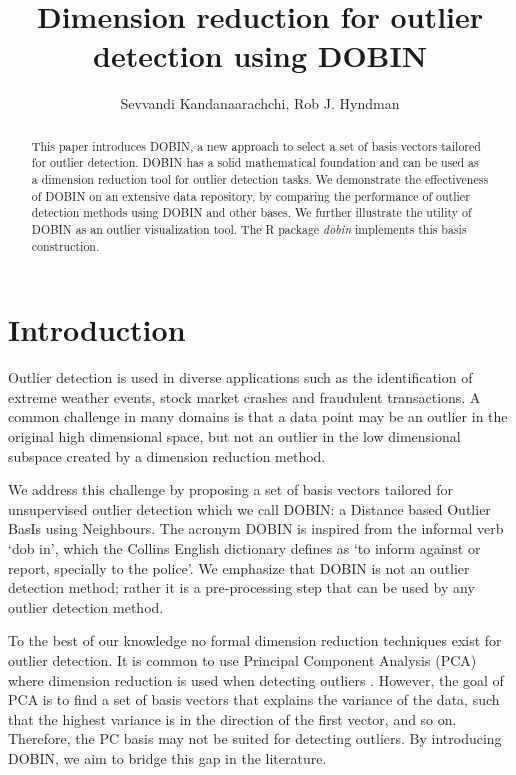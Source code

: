 \documentclass[a4paper,11pt]{article}
\begin{document}

\title{Dimension reduction for outlier detection using DOBIN}
\author{Sevvandi Kandanaarachchi, Rob J. Hyndman}
\maketitle

\begin{abstract}
	This paper introduces DOBIN, a new approach to select a set of basis vectors tailored for outlier detection. DOBIN has a solid mathematical foundation and can be used as a dimension reduction tool for outlier detection tasks. We demonstrate the effectiveness of DOBIN on an extensive data repository, by comparing the performance of outlier detection methods using DOBIN and other bases. We further illustrate the utility of DOBIN as an outlier visualization tool. The R package \textit{dobin} implements this basis construction.
\end{abstract}

\section{Introduction}

Outlier detection is used in diverse applications such as the identification of extreme weather events, stock market crashes and fraudulent transactions. A common challenge in many domains is that a data point may be an outlier in the original high dimensional space, but not an outlier in the low dimensional subspace created by a dimension reduction method.

We address this challenge by proposing a set of basis vectors tailored for unsupervised outlier detection which we call DOBIN: a Distance based Outlier BasIs using Neighbours. The acronym DOBIN is inspired from the informal verb `dob in', which the Collins English dictionary defines as `to inform against or report, specially to the police'. We emphasize that DOBIN is not an outlier detection method; rather it is a pre-processing step that can be used by any outlier detection method.

To the best of our knowledge no formal dimension reduction techniques exist for outlier detection. It is common to use Principal Component Analysis (PCA) where dimension reduction is used when detecting outliers \citep[e.g.,][]{talagala2019anomaly, hyndman2015large}. However, the goal of PCA is to find a set of basis vectors that explains the variance of the data, such that the highest variance is in the direction of the first vector, and so on. Therefore, the PC basis may not be suited for detecting outliers. By introducing DOBIN, we aim to bridge this gap in the literature.
\end{document}
